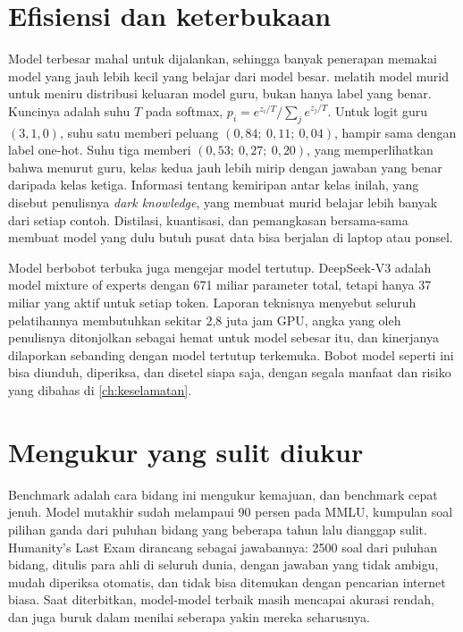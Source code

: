 \section{Efisiensi dan keterbukaan}

Model terbesar mahal untuk dijalankan, sehingga banyak penerapan memakai model yang jauh lebih kecil yang belajar dari model besar.
 \citep{hinton2015} melatih model murid untuk meniru distribusi keluaran model guru, bukan hanya label
yang benar. Kuncinya adalah suhu $T$ pada softmax, $p_i=e^{z_i/T}/\sum_je^{z_j/T}$. Untuk logit guru $(3,1,0)$, suhu satu memberi
peluang $(0{,}84;\ 0{,}11;\ 0{,}04)$, hampir sama dengan label one-hot. Suhu tiga memberi $(0{,}53;\ 0{,}27;\ 0{,}20)$, yang
memperlihatkan bahwa menurut guru, kelas kedua jauh lebih mirip dengan jawaban yang benar daripada kelas ketiga. Informasi tentang
kemiripan antar kelas inilah, yang disebut penulisnya \emph{dark knowledge}, yang membuat murid belajar lebih banyak dari setiap contoh.
Distilasi, kuantisasi, dan pemangkasan bersama-sama membuat model yang dulu butuh pusat data bisa berjalan di laptop atau ponsel.

Model berbobot terbuka juga mengejar model tertutup. DeepSeek-V3 \citep{deepseekv3} adalah model mixture of experts dengan 671 miliar
parameter total, tetapi hanya 37 miliar yang aktif untuk setiap token. Laporan teknisnya menyebut seluruh pelatihannya membutuhkan
sekitar 2,8 juta jam GPU, angka yang oleh penulisnya ditonjolkan sebagai hemat untuk model sebesar itu, dan kinerjanya dilaporkan sebanding dengan
model tertutup terkemuka. Bobot model seperti ini bisa diunduh, diperiksa, dan disetel siapa saja, dengan segala manfaat dan risiko
yang dibahas di \cref{ch:keselamatan}.

\section{Mengukur yang sulit diukur}

Benchmark adalah cara bidang ini mengukur kemajuan, dan benchmark cepat jenuh. Model mutakhir sudah melampaui 90 persen pada MMLU,
kumpulan soal pilihan ganda dari puluhan bidang yang beberapa tahun lalu dianggap sulit. Humanity's Last Exam \citep{phan2025} dirancang
sebagai jawabannya: 2500 soal dari puluhan bidang, ditulis para ahli di seluruh dunia, dengan jawaban yang tidak ambigu, mudah
diperiksa otomatis, dan tidak bisa ditemukan dengan pencarian internet biasa. Saat diterbitkan, model-model terbaik masih mencapai
akurasi rendah, dan juga buruk dalam menilai seberapa yakin mereka seharusnya.

